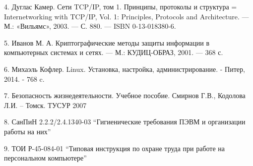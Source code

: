  4. Дуглас Камер. Сети TCP/IP, том 1. Принципы, протоколы и структура = Internetworking with TCP/IP, Vol. 1: Principles, Protocols and Architecture. — М.: «Вильямс», 2003. — С. 880. — ISBN 0-13-018380-6.
 
 5. Иванов М. А. Криптографические методы защиты информации в компьютерных системах и сетях. — М.: КУДИЦ-ОБРАЗ, 2001. — 368 с.
 
 6. Михаэль Кофлер. Linux. Установка, настройка, администрирование. - Питер, 2014. - 768 c.
 
 7. Безопасность жизнедеятельности. Учебное пособие. Смирнов Г.В., Кодолова Л.И. – Томск. ТУСУР 2007
 
 8. СанПиН 2.2.2/2.4.1340-03 ``Гигиенические требования ПЭВМ и организации работы на них''
 
 9. ТОИ Р-45-084-01 ``Типовая инструкция по охране труда при работе на персональном компьютере''

